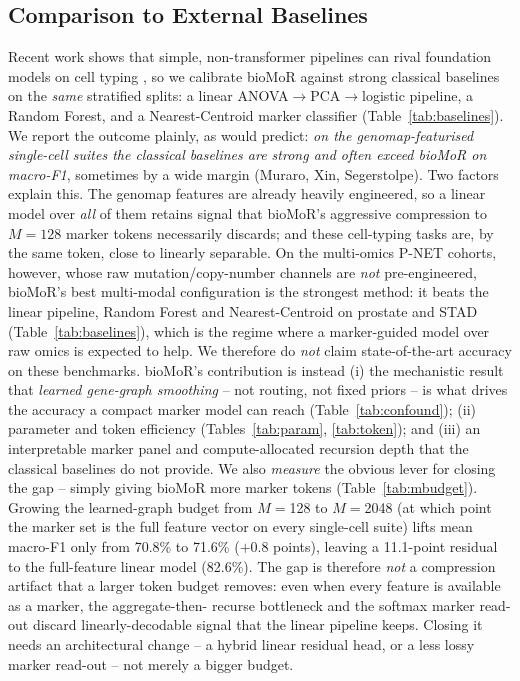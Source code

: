 \documentclass[letterpaper]{article}
\begin{document}
\subsection{Comparison to External Baselines}
\label{sec:baselines}
Recent work shows that simple, non-transformer pipelines can rival foundation models on
cell typing \cite{souza2024linear}, so we calibrate bioMoR against strong classical
baselines on the \emph{same} stratified splits: a linear ANOVA$\to$PCA$\to$logistic
pipeline, a Random Forest, and a Nearest-Centroid marker classifier
(Table~\ref{tab:baselines}). We report the outcome plainly, as \cite{souza2024linear}
would predict: \emph{on the genomap-featurised single-cell suites the classical baselines
are strong and often exceed bioMoR on macro-F1}, sometimes by a wide margin (Muraro, Xin,
Segerstolpe). Two factors explain this. The genomap features are already heavily
engineered, so a linear model over \emph{all} of them retains signal that bioMoR's
aggressive compression to $M{=}128$ marker tokens necessarily discards; and these
cell-typing tasks are, by the same token, close to linearly separable. On the multi-omics
P-NET cohorts, however, whose raw mutation/copy-number channels are \emph{not}
pre-engineered, bioMoR's best multi-modal configuration is the strongest method: it beats
the linear pipeline, Random Forest and Nearest-Centroid on prostate and STAD
(Table~\ref{tab:baselines}), which is the regime where a marker-guided model over raw omics
is expected to help. We therefore
do \emph{not} claim state-of-the-art accuracy on these benchmarks. bioMoR's contribution is
instead (i) the mechanistic result that \emph{learned gene-graph smoothing} -- not
routing, not fixed priors -- is what drives the accuracy a compact marker model can reach
(Table~\ref{tab:confound}); (ii) parameter and token efficiency (Tables~\ref{tab:param},
\ref{tab:token}); and (iii) an interpretable marker panel and compute-allocated recursion
depth that the classical baselines do not provide. We also \emph{measure} the obvious
lever for closing the gap -- simply giving bioMoR more marker tokens
(Table~\ref{tab:mbudget}). Growing the learned-graph budget from $M{=}$128 to
$M{=}$2048 (at which point the marker set is the full feature vector on every
single-cell suite) lifts mean macro-F1 only from 70.8\% to 71.6\%
($+$0.8 points), leaving a 11.1-point residual to the full-feature linear
model (82.6\%). The gap is therefore \emph{not} a compression artifact that a larger
token budget removes: even when every feature is available as a marker, the aggregate-then-
recurse bottleneck and the softmax marker read-out discard linearly-decodable signal that
the linear pipeline keeps. Closing it needs an architectural change -- a hybrid linear
residual head, or a less lossy marker read-out -- not merely a bigger budget.
\end{document}
